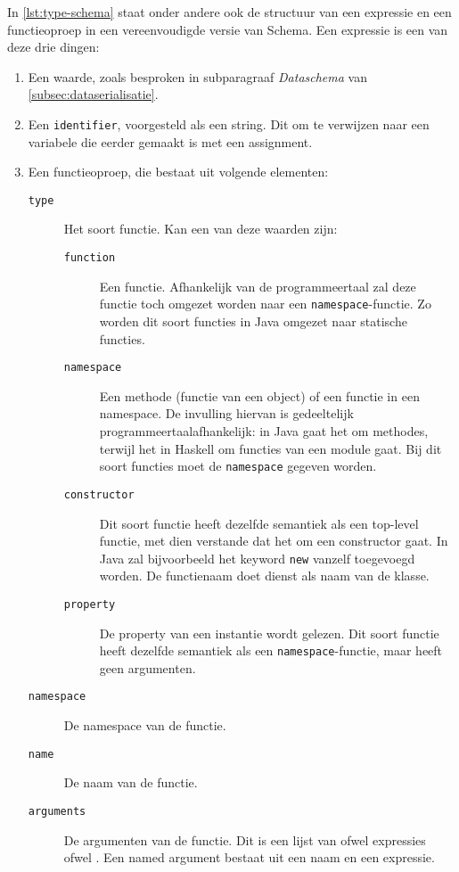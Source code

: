 In \cref{lst:type-schema} staat onder andere ook de structuur van een expressie en een functieoproep in een vereenvoudigde versie van  Schema.
Een expressie is een van deze drie dingen:
\begin{enumerate}
    \item Een waarde, zoals besproken in subparagraaf \emph{Dataschema} van \cref{subsec:dataserialisatie}.
    \item Een \texttt{identifier}, voorgesteld als een string.
    Dit om te verwijzen naar een variabele die eerder gemaakt is met een assignment.
    \item Een functieoproep, die bestaat uit volgende elementen:
    \begin{description}
        \item[\texttt{type}] Het soort functie.
        Kan een van deze waarden zijn:
        \begin{description}
            \item[\texttt{function}]
            Een  functie.
            Afhankelijk van de programmeertaal zal deze functie toch omgezet worden naar een \texttt{namespace}-functie.
            Zo worden dit soort functies in Java omgezet naar statische functies.
            \item[\texttt{namespace}]
            Een methode (functie van een object) of een functie in een namespace.
            De invulling hiervan is gedeeltelijk programmeertaalafhankelijk: in Java gaat het om methodes, terwijl het in Haskell om functies van een module gaat.
            Bij dit soort functies moet de \texttt{namespace} gegeven worden.
            \item[\texttt{constructor}]
            Dit soort functie heeft dezelfde semantiek als een top-level functie, met dien verstande dat het om een constructor gaat.
            In Java zal bijvoorbeeld het keyword \texttt{new} vanzelf toegevoegd worden.
            De functienaam doet dienst als naam van de klasse.
            \item[\texttt{property}]
            De property van een instantie wordt gelezen.
            Dit soort functie heeft dezelfde semantiek als een \texttt{namespace}-functie, maar heeft geen argumenten.
        \end{description}
        \item[\texttt{namespace}] De namespace van de functie.
        \item[\texttt{name}] De naam van de functie.
        \item[\texttt{arguments}] De argumenten van de functie.
        Dit is een lijst van ofwel expressies ofwel .
        Een named argument bestaat uit een naam en een expressie.
    \end{description}
\end{enumerate}

